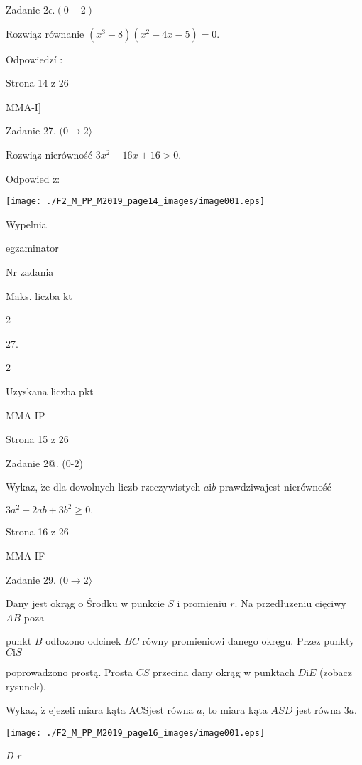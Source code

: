 \documentclass[a4paper,12pt]{article}
\begin{document}
Zadanie $2\epsilon. (0-2)$

Rozwiąz równanie $(x^{3}-8)(x^{2}-4x-5)=0.$

Odpowiedzí :

Strona 14 z 26

MMA-I]





Zadanie 27. $(0\rightarrow 2\rangle$

Rozwiąz nierówność $3x^{2}-16x+16>0.$

Odpowied $\acute{\mathrm{z}}$:
\begin{center}
\texttt{[image: ./F2\_M\_PP\_M2019\_page14\_images/image001.eps]}
\end{center}
Wypelnia

egzaminator

Nr zadania

Maks. liczba kt

2

27.

2

Uzyskana liczba pkt

MMA-IP

Strona 15 z 26





Zadanie 2@. (0-2)

Wykaz, $\dot{\mathrm{z}}\mathrm{e}$ dla dowolnych liczb rzeczywistych $a\mathrm{i}b$ prawdziwajest nierówność

$3a^{2}-2ab+3b^{2}\geq 0.$

Strona 16 z 26

MMA-IF





Zadanie 29. $(0\rightarrow 2\rangle$

Dany jest okrąg o Środku w punkcie $S$ i promieniu $r$. Na przedłuzeniu cięciwy $AB$ poza

punkt $B$ odłozono odcinek $BC$ równy promieniowi danego okręgu. Przez punkty $C \mathrm{i} S$

poprowadzono prostą. Prosta $CS$ przecina dany okrąg w punktach $D\mathrm{i}E$ (zobacz rysunek).

Wykaz, $\dot{\mathrm{z}}$ ejezeli miara kąta ACSjest równa $a$, to miara kąta $ASD$ jest równa $3a.$
\begin{center}
\texttt{[image: ./F2\_M\_PP\_M2019\_page16\_images/image001.eps]}
\end{center}
{\it D  r}
\end{document}
